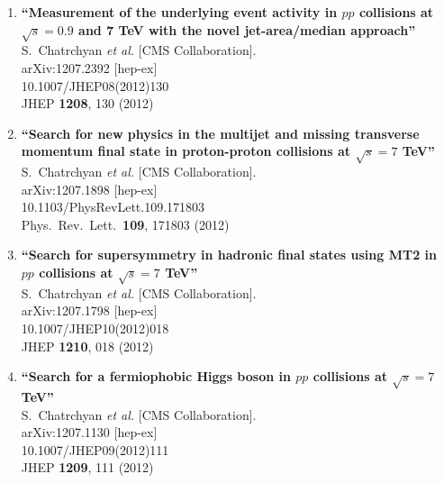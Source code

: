 \documentclass{article}
\begin{document}
\begin{enumerate}
\item%
{\bf ``Measurement of the underlying event activity in $pp$ collisions at $\sqrt{s} = 0.9$ and 7 TeV with the novel jet-area/median approach''}
  \\{}S.~Chatrchyan {\it et al.}  [CMS Collaboration].
  \\{}arXiv:1207.2392 [hep-ex]
    \\{}10.1007/JHEP08(2012)130
\\{}JHEP {\bf 1208}, 130 (2012) %


\item%
{\bf ``Search for new physics in the multijet and missing transverse momentum final state in proton-proton collisions at $\sqrt{s} = 7$ TeV''}
  \\{}S.~Chatrchyan {\it et al.}  [CMS Collaboration].
  \\{}arXiv:1207.1898 [hep-ex]
    \\{}10.1103/PhysRevLett.109.171803
\\{}Phys.\ Rev.\ Lett.\  {\bf 109}, 171803 (2012) %


\item%
{\bf ``Search for supersymmetry in hadronic final states using MT2 in $pp$ collisions at $\sqrt{s} = 7$ TeV''}
  \\{}S.~Chatrchyan {\it et al.}  [CMS Collaboration].
  \\{}arXiv:1207.1798 [hep-ex]
    \\{}10.1007/JHEP10(2012)018
\\{}JHEP {\bf 1210}, 018 (2012) %


\item%
{\bf ``Search for a fermiophobic Higgs boson in $pp$ collisions at $\sqrt{s}=7$ TeV''}
  \\{}S.~Chatrchyan {\it et al.}  [CMS Collaboration].
  \\{}arXiv:1207.1130 [hep-ex]
    \\{}10.1007/JHEP09(2012)111
\\{}JHEP {\bf 1209}, 111 (2012) %



\end{enumerate}
\end{document}
